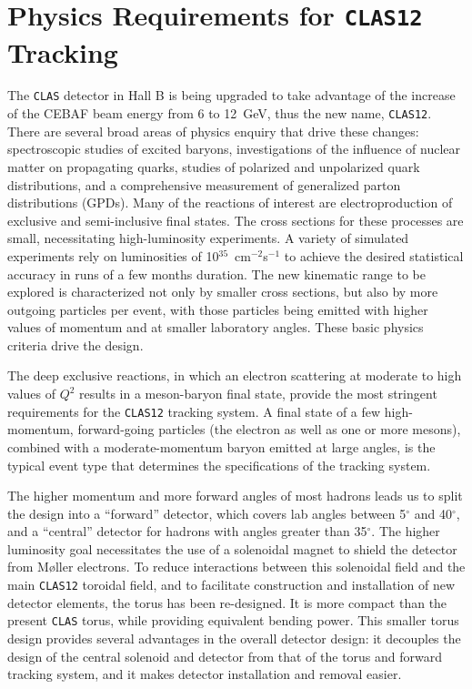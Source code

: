 \section{Physics Requirements for {\tt CLAS12} Tracking}

The {\tt CLAS} detector in Hall B is being upgraded to take advantage of 
the increase of the CEBAF beam energy from 6 to 12~GeV, thus the new name,  
{\tt CLAS12}.  There are several broad areas of physics enquiry that drive 
these changes: spectroscopic studies of excited baryons, investigations of 
the influence of nuclear matter on propagating quarks, studies of polarized 
and unpolarized quark distributions, and a comprehensive measurement of 
generalized parton distributions (GPDs).  Many of the reactions of interest 
are electroproduction of exclusive and semi-inclusive final states.  The 
cross sections for these processes are small, necessitating high-luminosity 
experiments.  A variety of simulated experiments rely on luminosities of 
10$^{35}$~cm$^{-2}$s$^{-1}$ to achieve the desired statistical accuracy in 
runs of a few months duration.  The new kinematic range to be explored is 
characterized not only by smaller cross sections, but also by more outgoing 
particles per event, with those particles being emitted with higher values 
of momentum and at smaller laboratory angles.  These basic physics criteria 
drive the design. 

The deep exclusive reactions, in which an electron scattering at moderate to 
high values of $Q^2$ results in a meson-baryon final state, provide the most 
stringent requirements for the {\tt CLAS12} tracking system.  A final state 
of a few high-momentum, forward-going particles (the electron as well as one 
or more mesons), combined with a moderate-momentum baryon emitted at large 
angles, is the typical event type that determines the specifications of the 
tracking system.

The higher momentum and more forward angles of most hadrons leads us to 
split the design into a ``forward'' detector, which covers lab angles between 
5$^\circ$ and 40$^\circ$, and a ``central'' detector for hadrons with angles 
greater than 35$^\circ$.  The higher luminosity goal necessitates the use of 
a solenoidal magnet to shield the detector from M{\o}ller electrons.  To 
reduce interactions between this solenoidal field and the main {\tt CLAS12} 
toroidal field, and to facilitate construction and installation of new 
detector elements, the torus has been re-designed.  It is more compact than 
the present {\tt CLAS} torus, while providing equivalent bending power.  This 
smaller torus design provides several advantages in the overall detector 
design: it decouples the design of the central solenoid and detector from 
that of the torus and forward tracking system, and it makes detector 
installation and removal easier.  

